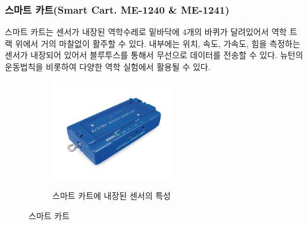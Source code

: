 \documentclass[12pt,a4paper]{article}
\begin{document}
\subsubsection{스마트 카트(Smart Cart. ME-1240 \& ME-1241)}
스마트 카트는 센서가 내장된 역학수레로 밑바닥에 4개의 바퀴가 달려있어서 역학
트랙 위에서 거의 마찰없이 활주할 수 있다. 내부에는 위치, 속도, 가속도, 힘을 측정하는
센서가 내장되어 있어서 블루투스를 통해서 무선으로 데이터를 전송할 수 있다. 뉴턴의
운동법칙을 비롯하여 다양한 역학 실험에서 활용될 수 있다.
\begin{figure}
    \centering
    \begin{subfigure}[]{0.4\textwidth}
        \centering
        \includegraphics[height=4.36cm]{ME-1241.png}
    \end{subfigure}
    \begin{subfigure}[]{0.4\textwidth}
        \centering
        \caption{\label{table1} 스마트 카트에 내장된 센서의 특성}
    \end{subfigure}
    \caption{\label{fig3} 스마트 카트}
\end{figure}
\end{document}
